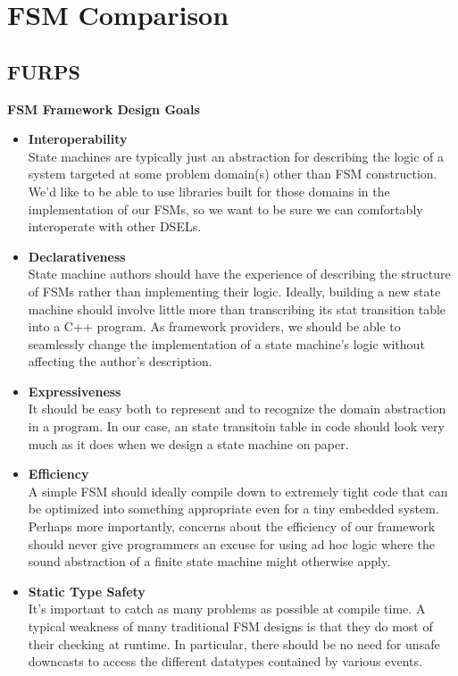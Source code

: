 \chapter{FSM Comparison}
\section{FURPS}

\textbf{FSM Framework Design Goals}
\begin{itemize}
\item \textbf{Interoperability}\\
    State machines are typically just an abstraction for describing the logic of a system
    targeted at some problem domain(s) other than FSM construction. We'd like to be able to use libraries
    built for those domains in the implementation of our FSMs, so we want to be sure we can comfortably
    interoperate with other DSELs.

\item \textbf{Declarativeness}\\
    State machine authors should have the experience of describing the structure of
    FSMs rather than implementing their logic. Ideally, building a new state machine should involve little
    more than transcribing its stat transition table into a C++ program. As framework providers, we should be able to
    seamlessly change the implementation of a state machine's logic without affecting the author's
    description.

\item \textbf{Expressiveness}\\
    It should be easy both to represent and to recognize the domain abstraction in a
    program. In our case, an state transitoin table in code should look very much as it does when we design a state
    machine on paper.

\item \textbf{Efficiency}\\
    A simple FSM should ideally compile down to extremely tight code
    that can be optimized into something appropriate even for a tiny embedded system. Perhaps more
    importantly, concerns about the efficiency of our framework should never give programmers an
    excuse for using ad hoc logic where the sound abstraction of a finite state machine might otherwise
    apply.

\item \textbf{Static Type Safety}\\
    It's important to catch as many problems as possible at compile time. A typical
    weakness of many traditional FSM designs is that they do most of their checking at
    runtime. In particular, there should be no need for unsafe downcasts to access the different datatypes
    contained by various events.


\end{itemize}
